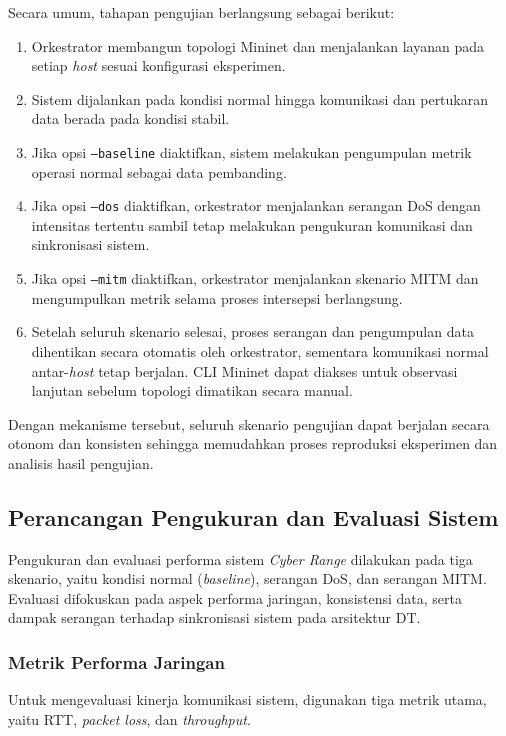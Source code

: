 Secara umum, tahapan pengujian berlangsung sebagai berikut:
\begin{enumerate}
    \item Orkestrator membangun topologi Mininet dan menjalankan layanan pada setiap \textit{host} sesuai konfigurasi eksperimen.

    \item Sistem dijalankan pada kondisi normal hingga komunikasi dan pertukaran data berada pada kondisi stabil.

    \item Jika opsi \texttt{--baseline} diaktifkan, sistem melakukan pengumpulan metrik operasi normal sebagai data pembanding.

    \item Jika opsi \texttt{--dos} diaktifkan, orkestrator menjalankan serangan \ac{DoS} dengan intensitas tertentu sambil tetap melakukan pengukuran komunikasi dan sinkronisasi sistem.
    
    \item Jika opsi \texttt{--mitm} diaktifkan, orkestrator menjalankan skenario \ac{MITM} dan mengumpulkan metrik selama proses intersepsi berlangsung.

    \item Setelah seluruh skenario selesai, proses serangan dan pengumpulan data dihentikan secara otomatis oleh orkestrator, sementara komunikasi normal antar-\textit{host} tetap berjalan. CLI Mininet dapat diakses untuk observasi lanjutan sebelum topologi dimatikan secara manual.
\end{enumerate}

Dengan mekanisme tersebut, seluruh skenario pengujian dapat berjalan secara otonom dan konsisten sehingga memudahkan proses reproduksi eksperimen dan analisis hasil pengujian.

\subsection{Perancangan Pengukuran dan Evaluasi Sistem}
\label{subsec:pengukuran_evaluasi_sistem}
Pengukuran dan evaluasi performa sistem \textit{Cyber Range} dilakukan pada tiga skenario, yaitu kondisi normal (\textit{baseline}), serangan DoS, dan serangan MITM. Evaluasi difokuskan pada aspek performa jaringan, konsistensi data, serta dampak serangan terhadap sinkronisasi sistem pada arsitektur DT.

\subsubsection{Metrik Performa Jaringan}
Untuk mengevaluasi kinerja komunikasi sistem, digunakan tiga metrik utama, yaitu \ac{RTT}, \textit{packet loss}, dan \textit{throughput}.

